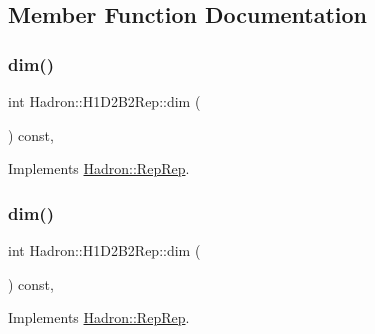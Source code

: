 \subsection{Member Function Documentation}
\mbox{\label{structHadron_1_1H1D2B2Rep_a85eefb2c84f92b80d516a6da91a49911}} 
\subsubsection{\texorpdfstring{dim()}{dim()}\hspace{0.1cm}{\footnotesize\ttfamily [1/5]}}
{\footnotesize\ttfamily int Hadron\+::\+H1\+D2\+B2\+Rep\+::dim (\begin{DoxyParamCaption}{ }\end{DoxyParamCaption}) const\hspace{0.3cm}{\ttfamily [inline]}, {\ttfamily [virtual]}}



Implements \mbox{\hyperlink{structHadron_1_1RepRep_a92c8802e5ed7afd7da43ccfd5b7cd92b}{Hadron\+::\+Rep\+Rep}}.

\mbox{\label{structHadron_1_1H1D2B2Rep_a85eefb2c84f92b80d516a6da91a49911}} 
\subsubsection{\texorpdfstring{dim()}{dim()}\hspace{0.1cm}{\footnotesize\ttfamily [2/5]}}
{\footnotesize\ttfamily int Hadron\+::\+H1\+D2\+B2\+Rep\+::dim (\begin{DoxyParamCaption}{ }\end{DoxyParamCaption}) const\hspace{0.3cm}{\ttfamily [inline]}, {\ttfamily [virtual]}}



Implements \mbox{\hyperlink{structHadron_1_1RepRep_a92c8802e5ed7afd7da43ccfd5b7cd92b}{Hadron\+::\+Rep\+Rep}}.

\mbox{\label{structHadron_1_1H1D2B2Rep_a85eefb2c84f92b80d516a6da91a49911}} 
